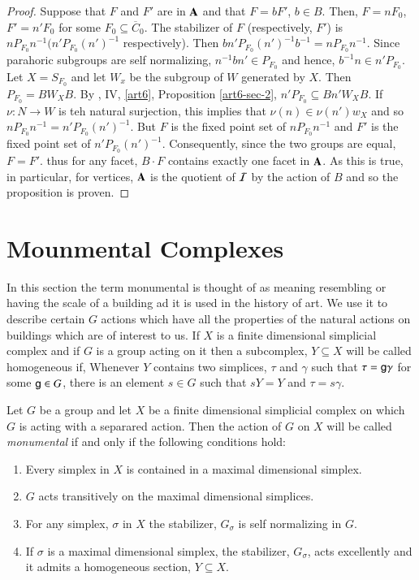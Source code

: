 \begin{proof}
Suppose that $F$ and $F'$ are in $\mathbf{A}$ and that $F=bF'$, $b \in B$. Then, $F= n F_{0}$, $F' =n'F_{0}$ for some $F_{0} \subseteq \overline{C}_{0}$. The stabilizer of $F$ (respectively, $F'$) is $nP_{F_{0}}n^{-1}(n'P_{F_{0}}(n')^{-1}$ respectively). Then $bn'P_{F_{0}}(n')^{-1}b^{-1} =nP_{F_{0}}n^{-1}$. Since parahoric subgroups are self normalizing, $n^{-1}bn' \in P_{F_{0}}$ and hence, $b^{-1}n \in n'P_{F_{0}}$. Let $X = S_{F_{0}}$ and let $W_{x}$ be the subgroup of $W$ generated by $X$. Then $P_{F_{0}} = BW_{X}B$. By \cite{art6-NB I}, IV, \ref{art6}, Proposition \ref{art6-sec-2}, $n'P_{F_{0}} \subseteq Bn'W_{X}B$. If $\nu : N \rightarrow W$ is teh natural surjection, this implies that $\nu(n) \in \nu(n')w_{X}$ and so $nP_{F_{0}}n^{-1} = n'P_{F_{0}}(n')^{-1}$. But $F$ is the fixed point set of $nP_{F_{0}}n^{-1}$ and $F'$ is the fixed point set of $n'P_{F_{0}}(n')^{-1}$. Consequently, since the two groups are equal, $F =F'$. thus for any facet, $B \cdot F$ contains exactly one facet in $\mathbf{A}$. As this is true, in particular, for vertices, $\mathbf{A}$ is the quotient of $\mathcal{I}$ by the action of $B$ and so the proposition is proven.  
\end{proof}

\section{Mounmental Complexes}\label{art6-sec-11}

In this section the term monumental is thought of as meaning resembling or having the scale of a building ad it is used in the history of art. We use it to describe certain $G$ actions which have all the properties of the natural actions on buildings which are of interest to us. If $X$ is a finite dimensional simplicial complex and if $G$ is a group acting on it then a subcomplex, $Y \subseteq X$ will be  called homogeneous if, Whenever $Y$ contains two simplices, $\tau$ and $\gamma$ such that $\tau = \mathsf{g} \gamma$ for some $\mathsf{g} \in G$, there is an element $s\in G$ such that $sY = Y$ and $\tau = s \gamma$.

\begin{definition}\label{art6-definition-11.1}
Let $G$ be a group and let $X$ be a finite dimensional simplicial complex on  which $G$ is acting with a separared action. Then the action of $G$ on $X$ will be called \textit{monumental} if and only if the following conditions hold:
\begin{enumerate}[\rm (1)]
\item Every simplex in $X$ is contained in a maximal dimensional simplex.\label{art6-}\label{art6-definition11.1-enum-1}
\item $G$ acts transitively on the maximal dimensional simplices.\label{art6-definition11.1-enum-2}
\item For any simplex, $\sigma$ in $X$ the stabilizer, $G_{\sigma}$ is self normalizing in $G$.\label{art6-definition11.1-enum-3}
\item If $\sigma$ is a maximal dimensional simplex, the stabilizer, $G_{\sigma}$, acts excellently and it admits a homogeneous section, $Y \subseteq X$.\label{art6-definition11.1-enum-4}
\end{enumerate}
\end{definition}

